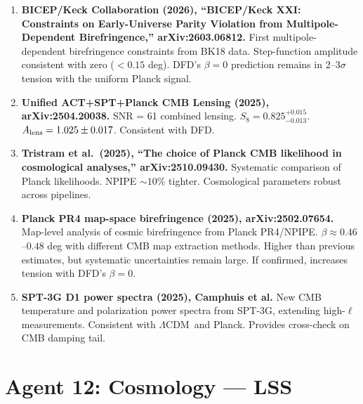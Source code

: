 \documentclass[11pt]{article}
\newcommand{\LCDM}{$\Lambda$CDM}
\begin{document}
\begin{tcolorbox}[colback=green!5!white, colframe=green!50!black,
  title=\textbf{Agent 11: NEW LITERATURE REVIEWED}]

\begin{enumerate}

\item \textbf{BICEP/Keck Collaboration (2026), ``BICEP/Keck XXI:
  Constraints on Early-Universe Parity Violation from
  Multipole-Dependent Birefringence,'' arXiv:2603.06812.}
  First multipole-dependent birefringence constraints from BK18 data.
  Step-function amplitude consistent with zero ($< 0.15$ deg).
  DFD's $\beta = 0$ prediction remains in 2--3$\sigma$ tension
  with the uniform Planck signal.

\item \textbf{Unified ACT+SPT+Planck CMB Lensing (2025),
  arXiv:2504.20038.}
  SNR = 61 combined lensing. $S_8 = 0.825^{+0.015}_{-0.013}$.
  $A_{\rm lens} = 1.025 \pm 0.017$. Consistent with DFD.

\item \textbf{Tristram et al.\ (2025), ``The choice of Planck CMB
  likelihood in cosmological analyses,'' arXiv:2510.09430.}
  Systematic comparison of Planck likelihoods. NPIPE $\sim 10\%$
  tighter. Cosmological parameters robust across pipelines.

\item \textbf{Planck PR4 map-space birefringence (2025),
  arXiv:2502.07654.}
  Map-level analysis of cosmic birefringence from Planck PR4/NPIPE.
  $\beta \approx 0.46$--$0.48$ deg with different CMB map extraction
  methods. Higher than previous estimates, but systematic uncertainties
  remain large. If confirmed, increases tension with DFD's $\beta = 0$.

\item \textbf{SPT-3G D1 power spectra (2025), Camphuis et al.}
  New CMB temperature and polarization power spectra from SPT-3G,
  extending high-$\ell$ measurements. Consistent with \LCDM\ and
  Planck. Provides cross-check on CMB damping tail.

\end{enumerate}
\end{tcolorbox}


\section{Agent 12: Cosmology --- LSS}
\end{document}
